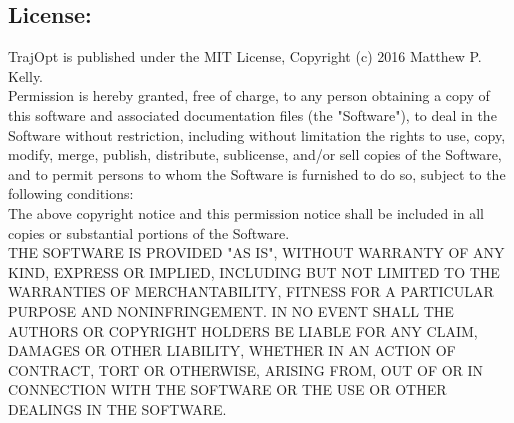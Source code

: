 \subsection{License: }
TrajOpt is published under the MIT License, Copyright (c) 2016 Matthew P. Kelly.  \vspace{0.5em} \\

Permission is hereby granted, free of charge, to any person obtaining a copy
of this software and associated documentation files (the "Software"), to deal
in the Software without restriction, including without limitation the rights
to use, copy, modify, merge, publish, distribute, sublicense, and/or sell
copies of the Software, and to permit persons to whom the Software is
furnished to do so, subject to the following conditions:  \vspace{0.5em} \\

The above copyright notice and this permission notice shall be included in
all copies or substantial portions of the Software.  \vspace{0.5em} \\

THE SOFTWARE IS PROVIDED "AS IS", WITHOUT WARRANTY OF ANY KIND, EXPRESS OR
IMPLIED, INCLUDING BUT NOT LIMITED TO THE WARRANTIES OF MERCHANTABILITY,
FITNESS FOR A PARTICULAR PURPOSE AND NONINFRINGEMENT. IN NO EVENT SHALL THE
AUTHORS OR COPYRIGHT HOLDERS BE LIABLE FOR ANY CLAIM, DAMAGES OR OTHER
LIABILITY, WHETHER IN AN ACTION OF CONTRACT, TORT OR OTHERWISE, ARISING FROM,
OUT OF OR IN CONNECTION WITH THE SOFTWARE OR THE USE OR OTHER DEALINGS IN
THE SOFTWARE.
